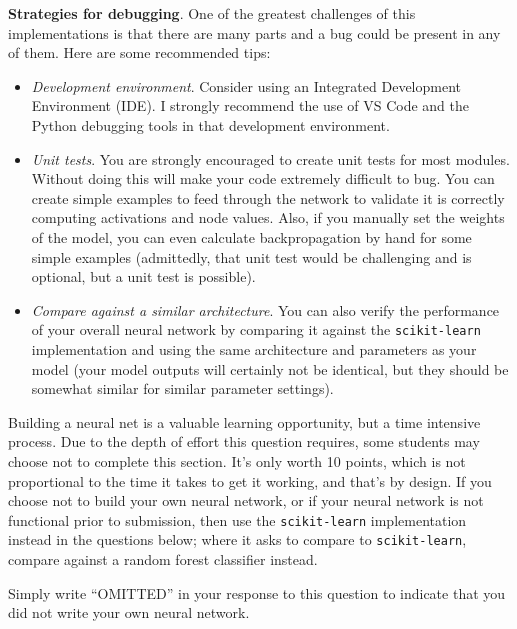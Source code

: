 \documentclass[
  letterpaper,
  DIV=11,
  numbers=noendperiod]{scrartcl}
\providecommand{\tightlist}{%
  \setlength{\itemsep}{0pt}\setlength{\parskip}{0pt}}\usepackage{longtable,booktabs,array}
\begin{document}
\textbf{Strategies for debugging}. One of the greatest challenges of
this implementations is that there are many parts and a bug could be
present in any of them. Here are some recommended tips:

\begin{itemize}
\tightlist
\item
  \emph{Development environment}. Consider using an Integrated
  Development Environment (IDE). I strongly recommend the use of VS Code
  and the Python debugging tools in that development environment.
\item
  \emph{Unit tests}. You are strongly encouraged to create unit tests
  for most modules. Without doing this will make your code extremely
  difficult to bug. You can create simple examples to feed through the
  network to validate it is correctly computing activations and node
  values. Also, if you manually set the weights of the model, you can
  even calculate backpropagation by hand for some simple examples
  (admittedly, that unit test would be challenging and is optional, but
  a unit test is possible).
\item
  \emph{Compare against a similar architecture}. You can also verify the
  performance of your overall neural network by comparing it against the
  \texttt{scikit-learn} implementation and using the same architecture
  and parameters as your model (your model outputs will certainly not be
  identical, but they should be somewhat similar for similar parameter
  settings).
\end{itemize}

\begin{tcolorbox}[enhanced jigsaw, rightrule=.15mm, leftrule=.75mm, colframe=quarto-callout-important-color-frame, toptitle=1mm, opacityback=0, opacitybacktitle=0.6, titlerule=0mm, bottomtitle=1mm, title=\textcolor{quarto-callout-important-color}{\faExclamation}\hspace{0.5em}{Important Note}, left=2mm, colback=white, coltitle=black, toprule=.15mm, breakable, arc=.35mm, bottomrule=.15mm, colbacktitle=quarto-callout-important-color!10!white]

Building a neural net is a valuable learning opportunity, but a time
intensive process. Due to the depth of effort this question requires,
some students may choose not to complete this section. It's only worth
10 points, which is not proportional to the time it takes to get it
working, and that's by design. If you choose not to build your own
neural network, or if your neural network is not functional prior to
submission, then use the \texttt{scikit-learn} implementation instead in
the questions below; where it asks to compare to \texttt{scikit-learn},
compare against a random forest classifier instead.

Simply write ``OMITTED'' in your response to this question to indicate
that you did not write your own neural network.

\end{tcolorbox}
\end{document}

